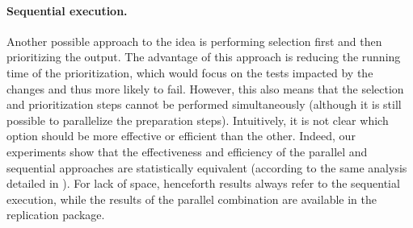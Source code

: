 %





\paragraph{Sequential execution.}
Another possible approach to the idea is performing selection first and then prioritizing the output.
The advantage of this approach is reducing the running time of the prioritization, which would focus on the tests impacted by the changes and thus more likely to fail.
However, this also means that the selection and prioritization steps cannot be performed simultaneously (although it is still possible to parallelize the preparation steps).
Intuitively, it is not clear which option should be more effective or efficient than the other.
Indeed, our experiments show that the effectiveness and efficiency of the parallel and sequential approaches are statistically equivalent (according to the same analysis detailed in ).
For lack of space, henceforth \fz results always refer to the sequential execution, while the results of the parallel combination are available in the replication package.

